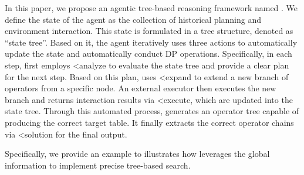 In this paper, we propose an agentic tree-based reasoning framework named \sys. We define the state of the agent as the collection of historical planning and environment interaction. This state is formulated in a tree structure, denoted as ``state tree''. Based on it, the agent iteratively uses three actions to automatically update the state and automatically conduct DP operations.
Specifically,
in each step, \sys first employs {<analyze} to evaluate the state tree and provide a clear plan for the next step. Based on this plan, \sys uses {<expand} to extend a new branch of operators from a specific node. An external executor then executes the new branch and returns interaction results via {<execute}, which are updated into the state tree. Through this automated process, \sys generates an operator tree capable of producing the correct target table. It finally extracts the correct operator chains via {<solution} for the final output.

Specifically, we provide an example to illustrates how \sys leverages the global information to implement precise tree-based search.

